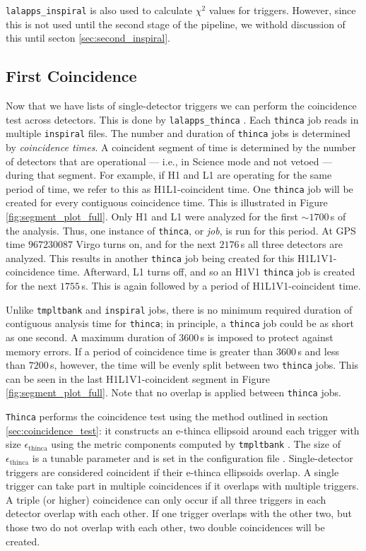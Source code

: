 \texttt{lalapps\_inspiral} is also used to calculate $\chi^2$ values for
triggers. However, since this is not used until the second stage of the
pipeline, we withold discussion of this until secton \ref{sec:second_inspiral}.

\subsection{First Coincidence}
\label{sec:first_thinca}

Now that we have lists of single-detector triggers we can perform the
coincidence test across detectors. This is done by \texttt{lalapps\_thinca}
\cite{Keppel:thesis}. Each \texttt{thinca} job reads in multiple
\texttt{inspiral} files. The number and duration of \texttt{thinca} jobs is
determined by \emph{coincidence times}. A coincident segment of time is
determined by the number of detectors that are operational --- i.e., in Science
mode and not vetoed --- during that segment. For example, if H1 and L1 are
operating for the same period of time, we refer to this as H1L1-coincident
time. One \texttt{thinca} job will be created for every contiguous coincidence
time. This is illustrated in Figure \ref{fig:segment_plot_full}. Only H1 and L1
were analyzed for the first $\sim1700\,$s of the analysis. Thus, one instance
of \texttt{thinca}, or \emph{job}, is run for this period. At GPS time
$967230087$ Virgo turns on, and for the next $2176\,$s all three detectors are
analyzed. This results in another \texttt{thinca} job being created for this
H1L1V1-coincidence time. Afterward, L1 turns off, and so an H1V1
\texttt{thinca} job is created for the next $1755\,$s. This is again followed
by a period of H1L1V1-coincident time.

Unlike \texttt{tmpltbank} and \texttt{inspiral} jobs, there is no minimum
required duration of contiguous analysis time for \texttt{thinca}; in
principle, a \texttt{thinca} job could be as short as one second. A maximum
duration of $3600\,$s is imposed to protect against memory errors. If a period
of coincidence time is greater than $3600\,$s and less than $7200\,$s, however,
the time will be evenly split between two \texttt{thinca} jobs. This can be
seen in the last H1L1V1-coincident segment in Figure
\ref{fig:segment_plot_full}. Note that no overlap is applied between
\texttt{thinca} jobs.

\texttt{Thinca} performs the coincidence test using the method outlined in
section \ref{sec:coincidence_test}: it constructs an e-thinca ellipsoid around
each trigger with size $\epsilon_{\mathrm{thinca}}$ using the metric components
computed by \texttt{tmpltbank} \cite{Robinson:2008}. The size of
$\epsilon_{\mathrm{thinca}}$ is a tunable parameter and is set in the
configuration file \cite{Keppel:thesis}. Single-detector triggers are
considered coincident if their e-thinca ellipsoids overlap. A single trigger
can take part in multiple coincidences if it overlaps with multiple triggers. A
triple (or higher) coincidence can only occur if all three triggers in each
detector overlap with each other. If one trigger overlaps with the other two,
but those two do not overlap with each other, two double coincidences will be
created.

